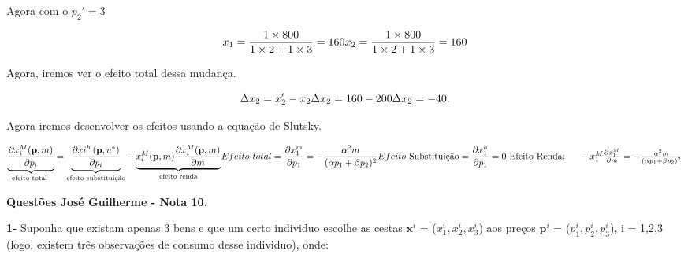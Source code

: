 \documentclass[a4paper, 12pt]{article} %
\begin{document}
\begin{flushleft}
\begin{center}
Agora com o $p_{2}' = 3$
\end{center}

\begin{equation}
x_{1} = \dfrac{1 \times 800}{1 \times 2 + 1 \times 3 } = 160
$$\\$$
x_{2} = \dfrac{1 \times 800}{1 \times 2 + 1 \times 3 } = 160
\end{equation}

\begin{center}
Agora, iremos ver o efeito total dessa mudança.
\end{center}

\begin{equation}
\Delta x_{2} = x_{2}' - x_{2}
$$\\$$
\Delta x_{2} = 160 - 200
$$\\$$
\Delta x_{2} = -40.
\end{equation}

\begin{center}
Agora iremos desenvolver os efeitos usando a equação de Slutsky.
\end{center}

\begin{equation}
$$\\$$
\underbrace{{\dfrac{\partial x_{i}^{M}(\mathbf{p}, m)}{\partial p_{i}}}}_{{\text {efeito total }}}= \underbrace{{\dfrac{\partial x{i}^{h}\left(\mathbf{p}, u^{*}\right)}{\partial p_{i}}}}_{{\text {efeito substituição}}} - \underbrace{ x_{i}^{M}(\mathbf{p}, m) \dfrac{\partial x_{i}^{M}(\mathbf{p}, m)}{\partial m}}_{{\text {efeito renda}}}
$$\\$$
Efeito \ total = \dfrac{\partial x_{1}^{m}}{\partial p_{1}} = - \dfrac{\alpha^{2}m}{(\alpha p_{1} + \beta p_{2})^{2}}
$$\\$$
Efeito \ \text{Substituição} = \dfrac{\partial x_{1}^{h}}{\partial p_{1}}=0
$$\\$$
\text { Efeito Renda: } \quad-x_{1}^{M} \frac{\partial x_{1}^{M}}{\partial m}=-\frac{\alpha^{2} m}{\left(\alpha p_{1}+\beta p_{2}\right)^{2}}
\end{equation}

\singlespacing

\textbf{Questões José Guilherme - Nota 10.}

\singlespacing

\textbf{1-} Suponha que existam apenas 3 bens e que um certo individuo escolhe as cestas $\textbf{x}^{i}$ = ($x_{1}^{i},x_{2}^{i},x_{3}^{i}$) aos preços $\textbf{p}^{i}$ = ($p_{1}^{i},p_{2}^{i},p_{3}^{i}$), i = 1,2,3 (logo, existem três observações de consumo desse
individuo), onde:


\end{flushleft}
\end{document}
